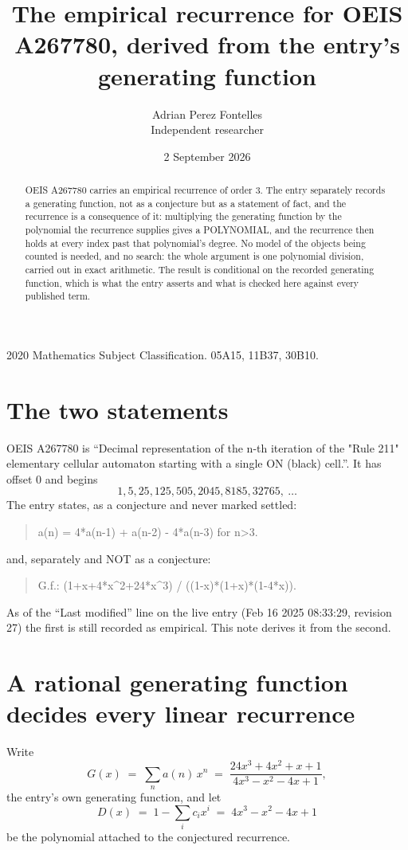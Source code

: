\documentclass[11pt,a4paper]{article}
\title{The empirical recurrence for OEIS A267780, derived from the entry's generating function}
\author{Adrian Perez Fontelles\\ \small Independent researcher}
\date{2 September 2026}
\theoremstyle{plain}
\theoremstyle{definition}
\begin{document}
\maketitle

\begin{abstract}
OEIS A267780 carries an empirical recurrence of order $3$. The entry separately records a
generating function, not as a conjecture but as a statement of fact, and the recurrence is a
consequence of it: multiplying the generating function by the polynomial the recurrence
supplies gives a POLYNOMIAL, and the recurrence then holds at every index past that
polynomial's degree. No model of the objects being counted is needed, and no search: the
whole argument is one polynomial division, carried out in exact arithmetic. The result is
conditional on the recorded generating function, which is what the entry asserts and what is
checked here against every published term.
\end{abstract}

\noindent\small 2020 Mathematics Subject Classification. 05A15, 11B37, 30B10.\normalsize

\section{The two statements}

OEIS A267780 is ``Decimal representation of the n-th iteration of the "Rule 211" elementary cellular automaton starting with a single ON (black) cell.''. It has offset $0$ and begins
\[
1, 5, 25, 125, 505, 2045, 8185, 32765,\ \dots
\]
The entry states, as a conjecture and never marked settled:
\begin{quote}
a(n) = 4*a(n-1) + a(n-2) - 4*a(n-3) for n>3.
\end{quote}
and, separately and NOT as a conjecture:
\begin{quote}
G.f.: (1+x+4*x\^{}2+24*x\^{}3) / ((1-x)*(1+x)*(1-4*x)).
\end{quote}
As of the ``Last modified'' line on the live entry (Feb 16 2025 08:33:29, revision 27) the first is still
recorded as empirical. This note derives it from the second.

\section{A rational generating function decides every linear recurrence}

Write
\[
G(x)\;=\;\sum_{n}a(n)\,x^{n}\;=\;\frac{24 x^{3} + 4 x^{2} + x + 1}{4 x^{3} - x^{2} - 4 x + 1},
\]
the entry's own generating function, and let
\[
D(x)\;=\;1-\sum_i c_i x^{i}\;=\;4 x^{3} - x^{2} - 4 x + 1
\]
be the polynomial attached to the conjectured recurrence.
\end{document}
